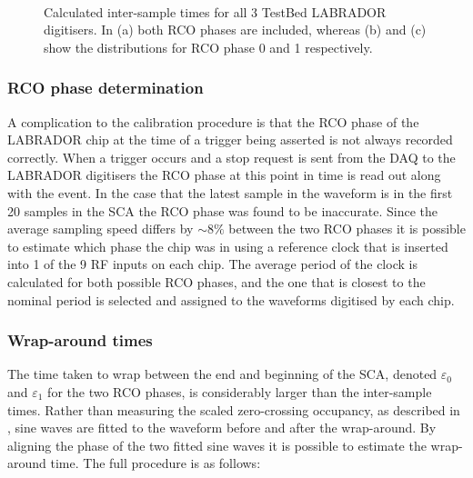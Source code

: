 \begin{figure}[htpb]
  \\
  \hfill
  \caption{Calculated inter-sample times for all 3 TestBed LABRADOR digitisers. In (a) both RCO phases are included, whereas (b) and (c) show the distributions for RCO phase 0 and 1 respectively.}
  \label{fig:calibration:LABRADOR-Digitiser-Chip:Inter-sample-times}
\end{figure}

\subsubsection{RCO phase determination}
\label{sec:calibration:LABRADOR-Digitiser-Chip:RCO-phase-determination}

A complication to the calibration procedure is that the RCO phase of the LABRADOR chip at the time of a trigger being asserted is not always recorded correctly. When a trigger occurs and a stop request is sent from the DAQ to the LABRADOR digitisers the RCO phase at this point in time is read out along with the event. In the case that the latest sample in the waveform is in the first 20 samples in the SCA the RCO phase was found to be inaccurate. Since the average sampling speed differs by $\sim 8 \%$ between the two RCO phases it is possible to estimate which phase the chip was in using a reference clock that is inserted into 1 of the 9 RF inputs on each chip. The average period of the clock is calculated for both possible RCO phases, and the one that is closest to the nominal period is selected and assigned to the waveforms digitised by each chip. 


\subsubsection{Wrap-around times}
\label{sec:calibration:LABRADOR-Digitiser-Chip:Wrap-around-times}

The time taken to wrap between the end and beginning of the SCA, denoted $\varepsilon_{0}$ and $\varepsilon_{1}$ for the two RCO phases, is considerably larger than the inter-sample times. Rather than measuring the scaled zero-crossing occupancy, as described in , sine waves are fitted to the waveform before and after the wrap-around. By aligning the phase of the two fitted sine waves it is possible to estimate the wrap-around time. The full procedure is as follows:

